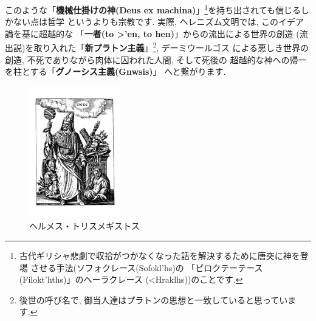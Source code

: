 このような「\textbf{機械仕掛けの神(Deus ex machina)}」\footnote{
古代ギリシャ悲劇で収拾がつかなくなった話を解決するために唐突に神を登場
させる手法(ソフォクレース(\textgreek{Sofokl'hs})の
「ピロクテーテース(\textgreek{Filokt'hths})」のヘーラクレース
(\textgreek{<Hraklhs}))のことです.}を持ち出されても信じるしかない点は哲学
というよりも宗教です. 実際, ヘレニズム文明では, このイデア論を基に超越的な
「\textbf{一者(\textgreek{to >'en}, to hen)}」からの流出による世界の創造
(流出説)を取り入れた「\textbf{新プラトン主義}」\footnote{後世の呼び名で,
 御当人達はプラトンの思想と一致していると思っています.}, デーミウールゴス
による悪しき世界の創造, 不死でありながら肉体に囚われた人間, そして死後の
超越的な神への帰一を柱とする「\textbf{グノーシス主義(\textgreek{Gnwsis})}」
へと繋がります.


\begin{figure}
\includegraphics[width=4cm]{HermesTrismegistusCauc.pdf}
\caption{ヘルメス・トリスメギストス}
\label{fig:trismegistus}
\end{figure}

